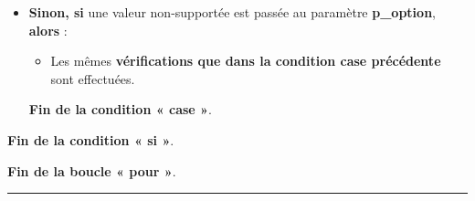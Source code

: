 \documentclass[a4paper,10pt]{article}
\begin{document}
\begin{itemize}
{\begin{itemize}
{\begin{itemize}
{                        \begin{justify}
                            \textbf{\color{cond}Fin de la condition « si »}.
                        \end{justify}
                    }
                \end{itemize}
            }

            \item
            {
                \setlength{\parskip}{2em}

                \begin{justify}
                    \textbf{\color{case}Sinon, si} une valeur non-supportée est passée au paramètre \textbf{\color{vars}p\_option}, \textbf{\color{case}alors} :
                \end{justify}

                \setlength{\parskip}{1em}

                \begin{itemize}
                    \item
                    {
                        \begin{justify}
                            Les mêmes \textbf{\color{cond}vérifications que \color{case}dans la condition case précédente} sont effectuées.
                        \end{justify}
                    }
                \end{itemize}

                \begin{justify}
                    \textbf{\color{case}Fin de la condition « case »}.
                \end{justify}
            }
        \end{itemize}

        \begin{justify}
            \textbf{\color{cond}Fin de la condition « si »}.
        \end{justify}
    }
\end{itemize}

\begin{justify}
    \textbf{\color{loop}Fin de la boucle « pour »}.
\end{justify}

\setlength{\parskip}{1em}


\par\noindent\rule{\textwidth}{0.4pt}
\end{document}
